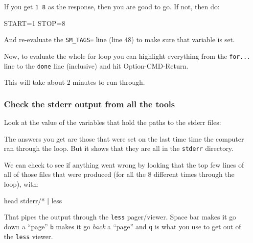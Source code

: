 \documentclass[]{krantz}
\makeatletter
\newenvironment{Shaded}{\begin{snugshade}}{\end{snugshade}}
\newcommand{\BuiltInTok}[1]{#1}
\newcommand{\FunctionTok}[1]{\textcolor[rgb]{0,0,0}{#1}}
\newcommand{\KeywordTok}[1]{\textcolor[rgb]{0.27,0.27,0.27}{\textbf{#1}}}
\newcommand{\NormalTok}[1]{#1}
\newcommand{\VariableTok}[1]{\textcolor[rgb]{0,0,0}{#1}}
\newenvironment{kframe}{%
\medskip{}
\setlength{\fboxsep}{.8em}
 \def\at@end@of@kframe{}%
 \ifinner\ifhmode%
  \def\at@end@of@kframe{\end{minipage}}%
  \begin{minipage}{\columnwidth}%
 \fi\fi%
 \def\FrameCommand##1{\hskip\@totalleftmargin \hskip-\fboxsep
 \colorbox{shadecolor}{##1}\hskip-\fboxsep
     \hskip-\linewidth \hskip-\@totalleftmargin \hskip\columnwidth}%
 \MakeFramed {\advance\hsize-\width
   \@totalleftmargin\z@ \linewidth\hsize
   \@setminipage}}%
 {\par\unskip\endMakeFramed%
 \at@end@of@kframe}
\renewenvironment{Shaded}{\begin{kframe}}{\end{kframe}}
\makeatother
\begin{document}
If you get \texttt{1\ 8} as the response, then you are good to go. If not, then
do:

\begin{Shaded}
\begin{Highlighting}[]
\VariableTok{START=}\NormalTok{1}
\VariableTok{STOP=}\NormalTok{8}
\end{Highlighting}
\end{Shaded}

And re-evaluate the \texttt{SM\_TAGS=} line (line 48) to make sure that variable
is set.

Now, to evaluate the whole for loop you can highlight everything from
the \texttt{for...} line to the \texttt{done} line (inclusive) and hit Option-CMD-Return.

This will take about 2 minutes to run through.

\hypertarget{check-the-stderr-output-from-all-the-tools}{%
\subsubsection{Check the stderr output from all the tools}\label{check-the-stderr-output-from-all-the-tools}}

Look at the value of the variables that hold the paths
to the stderr files:

\begin{Shaded}
\end{Shaded}

The answers you get are those that were set on the last time time
the computer ran through the loop. But it shows that they are
all in the \texttt{stderr} directory.

We can check to see if anything went wrong by looking that the top few lines
of all of those files that were produced (for all the 8 different times
through the loop), with:

\begin{Shaded}
\begin{Highlighting}[]
\FunctionTok{head}\NormalTok{ stderr/* }\KeywordTok{|} \FunctionTok{less}
\end{Highlighting}
\end{Shaded}

That pipes the output through the \texttt{less} pager/viewer. Space bar makes it go
down a ``page'' \texttt{b} makes it go \emph{back} a ``page'' and \texttt{q} is what you use
to get out of the \texttt{less} viewer.
\end{document}
